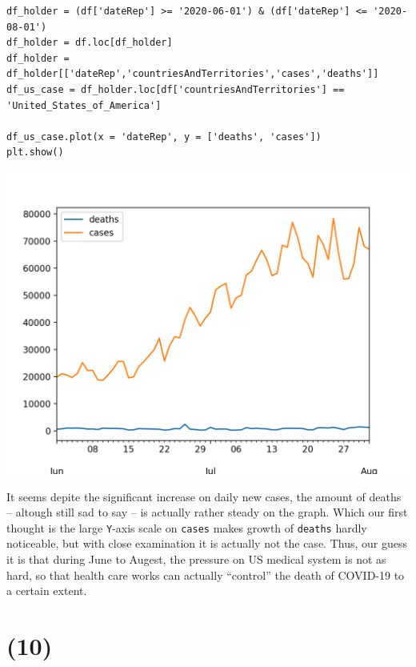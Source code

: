 \documentclass[12pt]{article}
\newcommand{\ilc}{\texttt}
\begin{document}
\begin{lstlisting}
df_holder = (df['dateRep'] >= '2020-06-01') & (df['dateRep'] <= '2020-08-01')
df_holder = df.loc[df_holder]
df_holder = df_holder[['dateRep','countriesAndTerritories','cases','deaths']]
df_us_case = df_holder.loc[df['countriesAndTerritories'] == 'United_States_of_America']

df_us_case.plot(x = 'dateRep', y = ['deaths', 'cases'])
plt.show()
\end{lstlisting}

\begin{center}
    \includegraphics[scale=0.8]{fig/p9.png}
\end{center}

It seems depite the significant increase on daily new cases, the amount of deaths -- altough still sad to say -- is actually rather steady on the graph. Which our first thought is the large \ilc{Y}-axis scale on \ilc{cases} makes growth of \ilc{deaths} hardly noticeable, but with close examination it is actually not the case. Thus, our guess it is that during June to Augest, the pressure on US medical system is not as hard, so that health care works can actually ``control'' the death of COVID-19 to a certain extent.

\section*{(10)}
\end{document}
